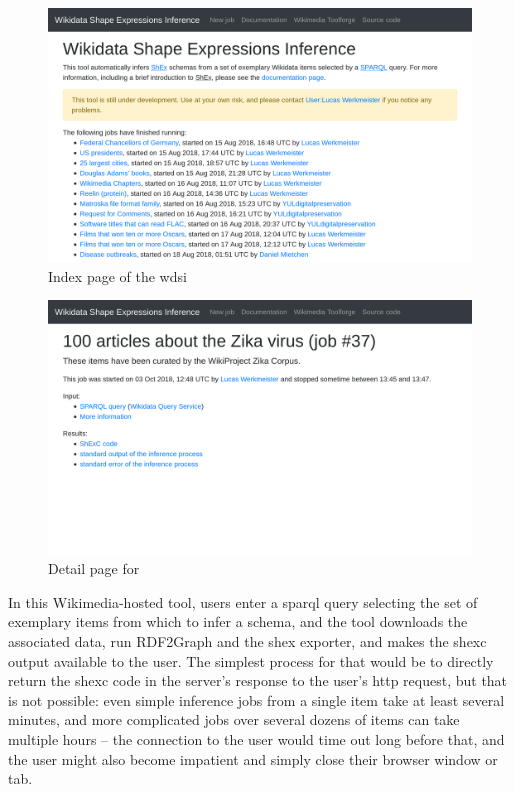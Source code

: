\begin{figure}
  \includegraphics[width=\textwidth]{screenshots/wdsi-index}
  \caption{Index page of the \gls{wdsi}}
  \label{fig:wdsi-index}
\end{figure}

\begin{figure}
  \includegraphics[width=\textwidth]{screenshots/wdsi-zika}
  \caption{Detail page for }
  \label{fig:wdsi-zika}
\end{figure}

In this \gls{Wikimedia}-hosted tool,
users enter a \gls{sparql} query selecting the set of exemplary \glspl{item} from which to infer a \gls{schema},
and the tool downloads the associated data,
run \gls{RDF2Graph} and the \gls{shex} exporter,
and makes the \gls{shexc} output available to the user.
The simplest process for that would be
to directly return the \gls{shexc} code in the server’s response to the user’s \gls{http} request,
but that is not possible:
even simple inference \glspl{job}
from a single \gls{item} take at least several minutes,
and more complicated \glspl{job}
over several dozens of \glspl{item} can take multiple hours –
the connection to the user would time out long before that,
and the user might also become impatient and simply close their browser window or tab.

